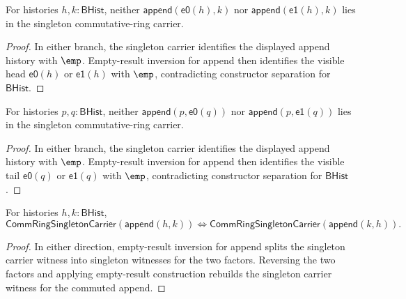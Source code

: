 \begin{theorem}
\label{thm:commring-singleton-carrier-append-visible-head-absurd}
For histories $h,k:\mathsf{BHist}$, neither
$\mathsf{append}(\mathsf{e0}(h),k)$ nor
$\mathsf{append}(\mathsf{e1}(h),k)$ lies in the singleton commutative-ring
carrier.
\end{theorem}
\begin{proof}
In either branch, the singleton carrier identifies the displayed append
history with $\emp$. Empty-result inversion for append then identifies the
visible head $\mathsf{e0}(h)$ or $\mathsf{e1}(h)$ with $\emp$, contradicting
constructor separation for $\mathsf{BHist}$.
\end{proof}

\begin{theorem}
\label{thm:commring-singleton-carrier-append-visible-tail-absurd}
For histories $p,q:\mathsf{BHist}$, neither
$\mathsf{append}(p,\mathsf{e0}(q))$ nor
$\mathsf{append}(p,\mathsf{e1}(q))$ lies in the singleton commutative-ring
carrier.
\end{theorem}
\begin{proof}
In either branch, the singleton carrier identifies the displayed append
history with $\emp$. Empty-result inversion for append then identifies the
visible tail $\mathsf{e0}(q)$ or $\mathsf{e1}(q)$ with $\emp$, contradicting
constructor separation for $\mathsf{BHist}$.
\end{proof}

\begin{theorem}
\label{thm:commring-singleton-carrier-append-comm-iff}
For histories $h,k:\mathsf{BHist}$,
$$
\mathsf{CommRingSingletonCarrier}(\mathsf{append}(h,k))
\Longleftrightarrow
\mathsf{CommRingSingletonCarrier}(\mathsf{append}(k,h)).
$$
\end{theorem}
\begin{proof}
In either direction, empty-result inversion for append splits the singleton
carrier witness into singleton witnesses for the two factors. Reversing the
two factors and applying empty-result construction rebuilds the singleton
carrier witness for the commuted append.
\end{proof}

